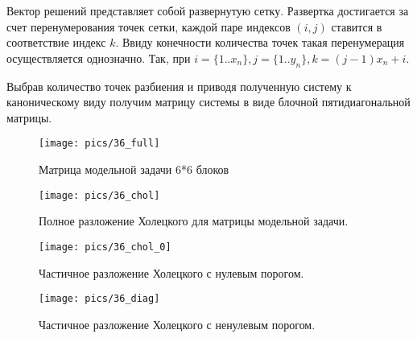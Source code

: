 Вектор решений представляет собой развернутую сетку. Развертка достигается за счет перенумерования точек сетки, каждой паре индексов $(i, j)$ ставится в соответствие индекс $k$. Ввиду конечности количества точек такая перенумерация осуществляется однозначно. Так, при $i = \{1..x_n\}, j = \{1..y_n\}, k = (j - 1) x_n + i$.

\clearpage
Выбрав количество точек разбиения и приводя полученную систему к каноническому виду получим матрицу системы в виде блочной пятидиагональной матрицы.

\begin{figure}[H]
    \centering
    \texttt{[image: pics/36\_full]}
    \caption{Матрица модельной задачи 6*6 блоков}
\end{figure}
\begin{figure}[H]
    \centering
    \texttt{[image: pics/36\_chol]}
    \caption{Полное разложение Холецкого для матрицы модельной задачи.}
\end{figure}
\begin{figure}[H]
    \centering
    \texttt{[image: pics/36\_chol\_0]}
    \caption{Частичное разложение Холецкого с нулевым порогом.}
\end{figure}
\begin{figure}[H]
    \centering
    \texttt{[image: pics/36\_diag]}
    \caption{Частичное разложение Холецкого с ненулевым порогом.}
\end{figure}